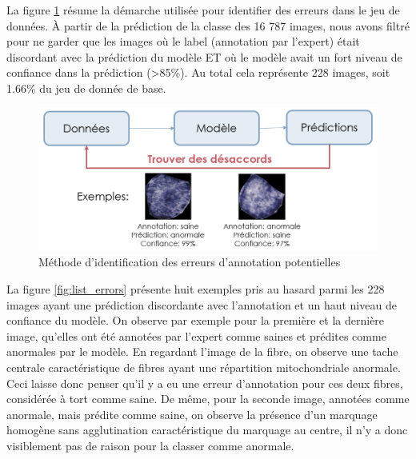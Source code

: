La figure \ref{fig:identify_errors} résume la démarche utilisée pour identifier des erreurs dans le jeu de données. À partir de la prédiction de la classe des 16 787 images, nous avons filtré pour ne garder que les images où le label (annotation par l'expert) était discordant avec la prédiction du modèle ET où le modèle avait un fort niveau de confiance dans la prédiction (>85\%). Au total cela représente 228 images, soit 1.66\% du jeu de donnée de base.
\begin{figure}[!ht]
 \centering
 \includegraphics[width=1\textwidth]{figures/identify_errors.png}
 \caption[Méthode d'identification des potentielles erreurs d'annotation]{Méthode d'identification des erreurs d'annotation potentielles }
 \label{fig:identify_errors}
\end{figure}

La figure \ref{fig:list_errors} présente huit exemples pris au hasard parmi les 228 images ayant une prédiction discordante avec l'annotation et un haut niveau de confiance du modèle. On observe par exemple pour la première et la dernière image, qu'elles ont été annotées par l'expert comme saines et prédites comme anormales par le modèle. En regardant l'image de la fibre, on observe une tache centrale caractéristique de fibres ayant une répartition mitochondriale anormale. Ceci laisse donc penser qu'il y a eu une erreur d'annotation pour ces deux fibres, considérée à tort comme saine. De même, pour la seconde image, annotées comme anormale, mais prédite comme saine, on observe la présence d'un marquage homogène sans agglutination caractéristique du marquage au centre, il n'y a donc visiblement pas de raison pour la classer comme anormale.

